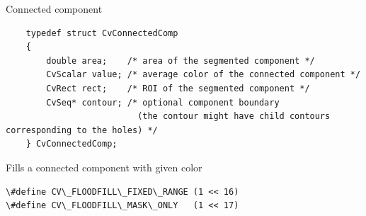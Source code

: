 Connected component

\begin{lstlisting}
    typedef struct CvConnectedComp
    {
        double area;    /* area of the segmented component */
        CvScalar value; /* average color of the connected component */
        CvRect rect;    /* ROI of the segmented component */
        CvSeq* contour; /* optional component boundary
                          (the contour might have child contours corresponding to the holes) */
    } CvConnectedComp;

\end{lstlisting}

\label{FloodFill}

Fills a connected component with given color


\begin{lstlisting}
\#define CV\_FLOODFILL\_FIXED\_RANGE (1 << 16)
\#define CV\_FLOODFILL\_MASK\_ONLY   (1 << 17)
\end{lstlisting}

